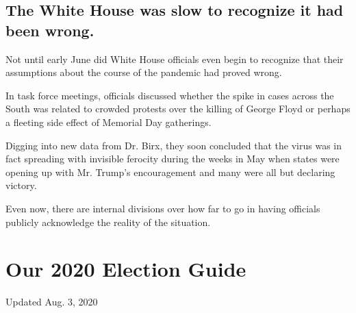 \hypertarget{the-white-house-was-slow-to-recognize-it-had-been-wrong}{%
\subsection{The White House was slow to recognize it had been
wrong.}\label{the-white-house-was-slow-to-recognize-it-had-been-wrong}}

Not until early June did White House officials even begin to recognize
that their assumptions about the course of the pandemic had proved
wrong.

In task force meetings, officials discussed whether the spike in cases
across the South was related to crowded protests over the killing of
George Floyd or perhaps a fleeting side effect of Memorial Day
gatherings.

Digging into new data from Dr. Birx, they soon concluded that the virus
was in fact spreading with invisible ferocity during the weeks in May
when states were opening up with Mr. Trump's encouragement and many were
all but declaring victory.

Even now, there are internal divisions over how far to go in having
officials publicly acknowledge the reality of the situation.

\hypertarget{our-2020-election-guide}{%
\section{Our 2020 Election Guide}\label{our-2020-election-guide}}

Updated Aug. 3, 2020


